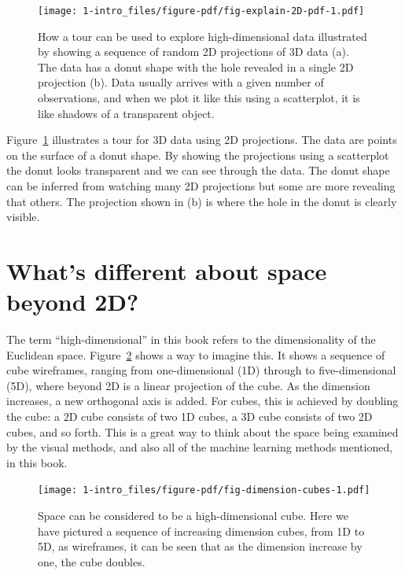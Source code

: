 \documentclass[
  letterpaper,
]{krantz}
\begin{document}

\begin{figure}

{\centering \texttt{[image: 1-intro\_files/figure-pdf/fig-explain-2D-pdf-1.pdf]}

}

\caption{\label{fig-explain-2D-pdf}How a tour can be used to explore
high-dimensional data illustrated by showing a sequence of random 2D
projections of 3D data (a). The data has a donut shape with the hole
revealed in a single 2D projection (b). Data usually arrives with a
given number of observations, and when we plot it like this using a
scatterplot, it is like shadows of a transparent object.}

\end{figure}

Figure~\ref{fig-explain-2D-pdf} illustrates a tour for 3D data using 2D
projections. The data are points on the surface of a donut shape. By
showing the projections using a scatterplot the donut looks transparent
and we can see through the data. The donut shape can be inferred from
watching many 2D projections but some are more revealing that others.
The projection shown in (b) is where the hole in the donut is clearly
visible. 

\hypertarget{whats-different-about-space-beyond-2d}{%
\section{What's different about space beyond
2D?}\label{whats-different-about-space-beyond-2d}}

The term ``high-dimensional'' in this book refers to the dimensionality
of the Euclidean space. Figure~\ref{fig-dimension-cubes} shows a way to
imagine this. It shows a sequence of cube wireframes, ranging from
one-dimensional (1D) through to five-dimensional (5D), where beyond 2D
is a linear projection of the cube. As the dimension increases, a new
orthogonal axis is added. For cubes, this is achieved by doubling the
cube: a 2D cube consists of two 1D cubes, a 3D cube consists of two 2D
cubes, and so forth. This is a great way to think about the space being
examined by the visual methods, and also all of the machine learning
methods mentioned, in this book.


\begin{figure}

{\centering \texttt{[image: 1-intro\_files/figure-pdf/fig-dimension-cubes-1.pdf]}

}

\caption{\label{fig-dimension-cubes}Space can be considered to be a
high-dimensional cube. Here we have pictured a sequence of increasing
dimension cubes, from 1D to 5D, as wireframes, it can be seen that as
the dimension increase by one, the cube doubles.}

\end{figure}
\end{document}
